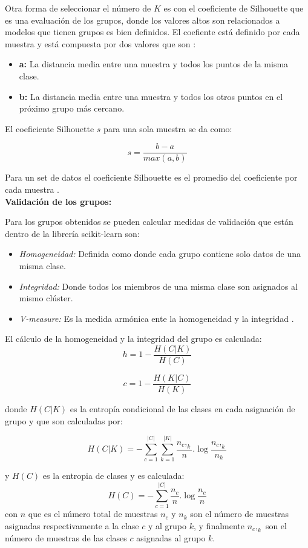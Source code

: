 Otra forma de seleccionar el número de $K$ es con el coeficiente de Silhouette que es una evaluación de los grupos, donde los valores altos son relacionados a modelos que tienen grupos es bien definidos. El coefiente está definido por cada muestra y está compuesta por dos valores que son \cite{scikit-learn,Rousseeuw1987}:

\begin{itemize}
	\item \textbf{a:} La distancia media entre una muestra y todos los puntos de la misma clase.
	\item \textbf{b:} La distancia media entre una muestra y todos los otros puntos en el próximo grupo más cercano.
\end{itemize}

El coeficiente Silhouette $s$ para una sola muestra se da como:

$$s = \frac{b-a}{max(a,b)}$$

Para un set de datos el coeficiente Silhouette es el promedio del coeficiente por cada muestra \cite{scikit-learn,Rousseeuw1987}. \\

\textbf{Validación de los grupos:}

Para los grupos obtenidos se pueden calcular  medidas de validación que están dentro de la librería scikit-learn \cite{scikit-learn} son:

\begin{itemize}
	\item  \textit{Homogeneidad:} Definida como donde cada grupo contiene solo datos de una misma clase.
	\item \textit{Integridad:} Donde todos los miembros de una misma clase son asignados al mismo clúster.	
	\item \textit{V-measure:} Es la medida armónica ente la homogeneidad y la integridad \cite{Rosenberg2007}. 		
\end{itemize}

El cálculo de la homogeneidad y la integridad del grupo es calculada:
$$h=1- \frac{H(C|K)}{H(C)} $$

$$c=1- \frac{H(K|C)}{H(K)}$$

donde $H(C|K)$ es la entropía condicional de las clases en cada asignación de grupo y que son calculadas por:

$$H(C|K)= - \sum_{c=1}^{|C|} \sum_{k=1}^{|K|} \frac{n_c,_k}{n} . \log \frac{n_c,_k}{n_k}$$ 

y $H(C)$ es la entropia de clases y es calculada:
$$H(C)=  - \sum_{c=1}^{|C|} \frac{n_c}{n} . \log \frac{n_c}{n}$$ 
con $n$ que es el número total de muestras $n_c$ y $n_k$ son el número de muestras asignadas respectivamente a la clase $c$ y al grupo $k$, y finalmente $n_c,_k$ son el número de muestras de las clases $c$ asignadas al grupo $k$.\\

